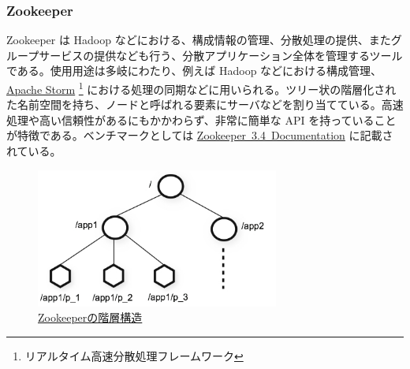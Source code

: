 \documentclass{scrartcl}
\begin{document}
\subsubsection{Zookeeper}
\label{sec:orge09f29e}
Zookeeper は Hadoop などにおける、構成情報の管理、分散処理の提供、またグループサービスの提供なども行う、分散アプリケーション全体を管理するツールである。使用用途は多岐にわたり、例えば Hadoop などにおける構成管理、 \href{http://storm.apache.org/}{Apache Storm}\textsuperscript{\texttrademark} \footnote{リアルタイム高速分散処理フレームワーク} における処理の同期などに用いられる。ツリー状の階層化された名前空間を持ち、ノードと呼ばれる要素にサーバなどを割り当てている。高速処理や高い信頼性があるにもかかわらず、非常に簡単な API を持っていることが特徴である。ベンチマークとしては \href{http://zookeeper.apache.org/doc/current/zookeeperOver.html#fg_zkPerfRW}{Zookeeper\ 3.4\ Documentation} に記載されている。\\

\begin{figure}[htbp]
\centering
\includegraphics[width=8cm]{./zknamespace.jpg}
\caption{\href{http://zookeeper.apache.org/doc/current/zookeeperOver.html\#fg_zkPerfRW}{Zookeeperの階層構造}}
\end{figure}

\newpage
\end{document}
